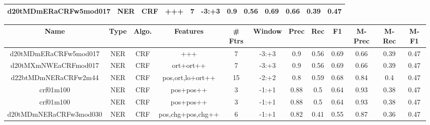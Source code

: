 \documentclass[a4paper]{article}
\begin{document}
\begin{landscape}
\begin{center}
\begin{tabular}{ |c|c|c|c|c|c|c|c|c|c|c|c|}
 	
 
 	
 		
 		\small{ d20tMDmERaCRFw5mod017 } & NER & CRF & +++  &  7 &  -3:+3  &  0.9 & 0.56 & 0.69  &  0.66 & 0.39 & 0.47 \\
 		
 \hline
\end{tabular}
\end{center}




\begin{center}
\begin{tabular}{ |c|c|c|c|c|c|c|c|c|c|c|c|} 
 \hline
 	Name & Type & Algo. & Features & \# Ftrs & Window & Prec & Rec & F1 & M-Prec & M-Rec & M-F1\\
 \hline

 		

 	
 
 	
 		
 		\small{ d20tMDmERaCRFw5mod017 } & NER & CRF & +++  &  7 &  -3:+3  &  0.9 & 0.56 & 0.69  &  0.66 & 0.39 & 0.47 \\
 		

 	
 
 	
 		
 		\small{ d20tMXmNWEaCRFmod017 } & NER & CRF & ort+ort++  &  7 &  -3:+3  &  0.9 & 0.56 & 0.69  &  0.66 & 0.39 & 0.47 \\
 		

 	
 
 	
 		
 		\small{ d22btMDmNERaCRFw2m44 } & NER & CRF & pos,ort,lo+ort++  &  15 &  -2:+2  &  0.8 & 0.59 & 0.68  &  0.84 & 0.4 & 0.47 \\
 		

 	
 
 	
 		
 		\small{ crf01m100 } & NER & CRF & pos+pos++  &  3 &  -1:+1  &  0.88 & 0.5 & 0.64  &  0.93 & 0.38 & 0.47 \\
 		

 	
 
 	
 		
 		\small{ crf01m100 } & NER & CRF & pos+pos++  &  3 &  -1:+1  &  0.88 & 0.5 & 0.64  &  0.93 & 0.38 & 0.47 \\
 		

 	
 
 	
 		
 		\small{ d20tMDmNERaCRFw3mod030 } & NER & CRF & pos,chg+pos,chg++  &  6 &  -1:+1  &  0.82 & 0.41 & 0.55  &  0.87 & 0.36 & 0.47 \\
 		


\end{tabular}
\end{center}
\end{landscape}
\end{document}
